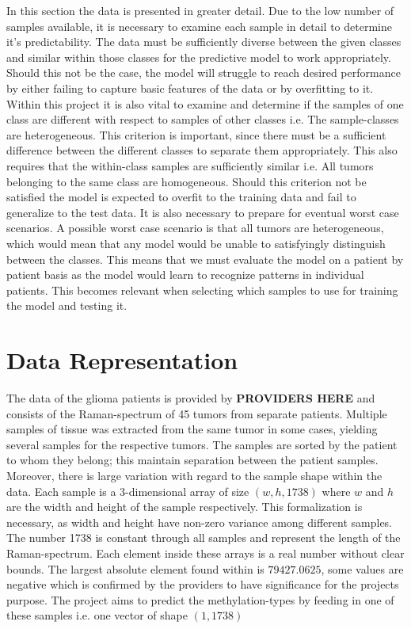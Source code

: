 In this section the data is presented in greater detail. Due to the low number of samples available, it is necessary to examine each sample in detail to determine it's predictability. The data must be sufficiently diverse between the given classes and similar within those classes for the predictive model to work appropriately. Should this not be the case, the model will struggle to reach desired performance by either failing to capture basic features of the data or by overfitting to it. Within this project it is also vital to examine and determine if the samples of one class are different with respect to samples of other classes i.e. The sample-classes are heterogeneous. This criterion is important, since there must be a sufficient difference between the different classes to separate them appropriately. This also requires that the within-class samples are sufficiently similar i.e. All tumors belonging to the same class are homogeneous. Should this criterion not be satisfied the model is expected to overfit to the training data and fail to generalize to the test data. It is also necessary to prepare for eventual worst case scenarios. A possible worst case scenario is that all tumors are heterogeneous, which would mean that any model would be unable to satisfyingly distinguish between the classes. This means that we must evaluate the model on a patient by patient basis as the model would learn to recognize patterns in individual patients. This becomes relevant when selecting which samples to use for training the model and testing it.  

\section{Data Representation}
The data of the glioma patients is provided by \textbf{PROVIDERS HERE} and consists of the Raman-spectrum of 45 tumors from separate patients. Multiple samples of tissue was extracted from the same tumor in some cases, yielding several samples for the respective tumors. The samples are sorted by the patient to whom they belong; this maintain separation between the patient samples. Moreover, there is large variation with regard to the sample shape within the data. Each sample is a 3-dimensional array of size $(w, h, 1738)$ where $w$ and $h$ are the width and height of the sample respectively. This formalization is necessary, as width and height have non-zero variance among different samples. The number 1738 is constant through all samples and represent the length of the Raman-spectrum. Each element inside these arrays is a real number without clear bounds. The largest absolute element found within is $79427.0625$, some values are negative which is confirmed by the providers to have significance for the projects purpose. The project aims to predict the methylation-types by feeding in one of these samples i.e. one vector of shape $(1, 1738)$

